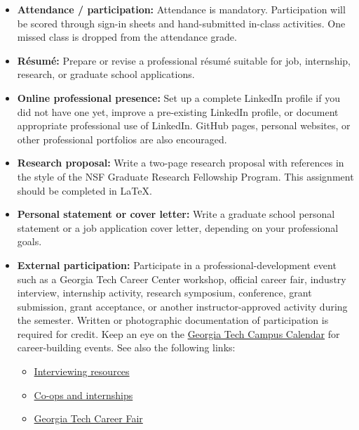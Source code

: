 \documentclass[11pt]{article}
\begin{document}
\begin{itemize}
    \item \textbf{Attendance / participation:} Attendance is mandatory. Participation will be scored through sign-in sheets and hand-submitted in-class activities. One missed class is dropped from the attendance grade.

    \item \textbf{R\'esum\'e:} Prepare or revise a professional r\'esum\'e suitable for job, internship, research, or graduate school applications.

    \item \textbf{Online professional presence:} Set up a complete LinkedIn profile if you did not have one yet, improve a pre-existing LinkedIn profile, or document appropriate professional use of LinkedIn. GitHub pages, personal websites, or other professional portfolios are also encouraged.

    \item \textbf{Research proposal:} Write a two-page research proposal with references in the style of the NSF Graduate Research Fellowship Program. This assignment should be completed in \LaTeX.

    \item \textbf{Personal statement or cover letter:} Write a graduate school personal statement or a job application cover letter, depending on your professional goals.

    \item \textbf{External participation:} Participate in a professional-development event such as a Georgia Tech Career Center workshop, official career fair, industry interview, internship activity, research symposium, conference, grant submission, grant acceptance, or another instructor-approved activity during the semester. Written or photographic documentation of participation is required for credit. Keep an eye on the \href{https://calendar.gatech.edu/}{Georgia Tech Campus Calendar} for career-building events. See also the following links:
    \begin{itemize}
        \item \href{https://career.gatech.edu/interviewing/}{Interviewing resources}
        \item \href{https://career.gatech.edu/apply-for-co-ops-and-internships/}{Co-ops and internships}
        \item \href{https://careerfair.gatech.edu/}{Georgia Tech Career Fair}
    \end{itemize}
\end{itemize}
\end{document}
